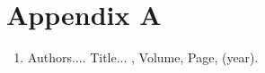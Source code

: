 \documentclass[MS]             %
              {iitmdiss_as}    %
\begin{document}

\appendix

\chapter{Appendix A}


\newpage
\begin{singlespace}

{\footnotesize
   
  
}
\end{singlespace}
\newpage



\listofpapers

\begin{enumerate}  
\item Authors....  \newblock
 Title...
  , Volume,
  Page, (year).
\end{enumerate}  
\end{document}
